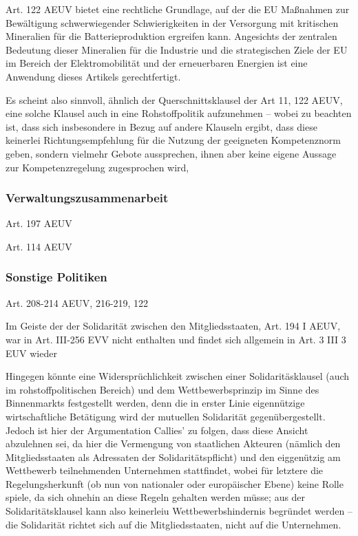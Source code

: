 \documentclass[12pt,a4paper,oneside]{book} %
\begin{document}
	Art. 122 AEUV bietet eine rechtliche Grundlage, auf der die EU Maßnahmen zur Bewältigung schwerwiegender Schwierigkeiten in der Versorgung mit kritischen Mineralien für die Batterieproduktion ergreifen kann. Angesichts der zentralen Bedeutung dieser Mineralien für die Industrie und die strategischen Ziele der EU im Bereich der Elektromobilität und der erneuerbaren Energien ist eine Anwendung dieses Artikels gerechtfertigt.
	
	Es scheint also sinnvoll, ähnlich der Querschnittsklausel der Art 11, 122 AEUV, eine solche Klausel auch in eine Rohstoffpolitik aufzunehmen -- wobei zu beachten ist, dass sich insbesondere in Bezug auf andere Klauseln ergibt, dass diese keinerlei Richtungsempfehlung für die Nutzung der geeigneten Kompetenznorm geben, sondern vielmehr Gebote aussprechen, ihnen aber keine eigene Aussage zur Kompetenzregelung zugesprochen wird,\autocite[39]{callies_umweltrecht_2022}
	
	
	\subsubsection{Verwaltungszusammenarbeit}
	Art. 197 AEUV
	
	Art. 114 AEUV
	
	\subsubsection{Sonstige Politiken}
	Art. 208-214 AEUV, 216-219, 122
	
	Im Geiste der der Solidarität zwischen den Mitgliedsstaaten, Art. 194 I AEUV, war in Art. III-256 EVV nicht enthalten und findet sich allgemein in Art. 3 III 3 EUV wieder
	
	Hingegen könnte eine Widersprüchlichkeit zwischen einer Solidaritäsklausel (auch im rohstoffpolitischen Bereich) und dem Wettbewerbsprinzip im Sinne des Binnenmarkts festgestellt werden, denn die in erster Linie eigennützige wirtschaftliche Betätigung wird der mutuellen Solidarität gegenübergestellt.\autocite{Ehricke/Hackländer: ZEuS 2008, S. 579, 595f.} Jedoch ist hier der Argumentation Callies' zu folgen, dass diese Ansicht abzulehnen sei, da hier die Vermengung von staatlichen Akteuren (nämlich den Mitgliedsstaaten als Adressaten der Solidaritätspflicht) und den eiggenützig am Wettbewerb teilnehmenden Unternehmen stattfindet, wobei für letztere die Regelungsherkunft (ob nun von nationaler oder europäischer Ebene) keine Rolle spiele, da sich ohnehin an diese Regeln gehalten werden müsse; aus der Solidaritätsklausel kann also keinerleiu Wettbewerbshindernis begründet werden -- die Solidarität richtet sich auf die Mitgliedsstaaten, nicht auf die Unternehmen.
	
\end{document}

